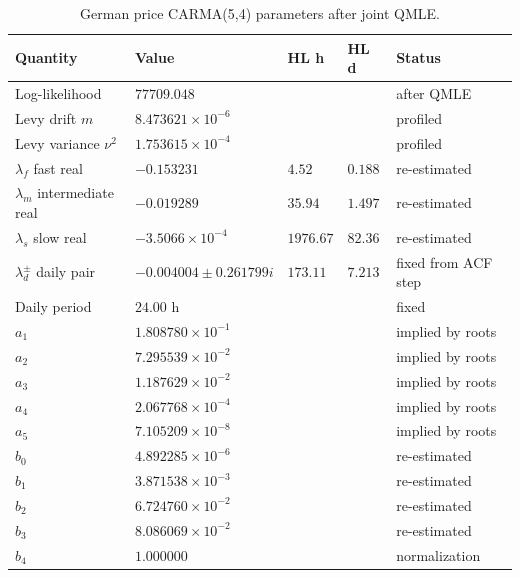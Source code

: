\begin{table}[!htbp]
  \centering
  \caption{German price CARMA(5,4) parameters after joint QMLE.}
  \label{tab:price-carma-after-qmle}
  \begin{tabular}{@{}lllll@{}}
    \toprule
    Quantity & Value & HL h & HL d & Status \\
    \midrule
    Log-likelihood & \(77709.048\) & & & after QMLE \\
    Levy drift \(m\) & \(8.473621{\times}10^{-6}\) & & & profiled \\
    Levy variance \(\nu^2\) & \(1.753615{\times}10^{-4}\) & & & profiled \\
    \midrule
    \(\lambda_f\) fast real & \(-0.153231\) & \(4.52\) & \(0.188\) & re-estimated \\
    \(\lambda_m\) intermediate real & \(-0.019289\) & \(35.94\) & \(1.497\) & re-estimated \\
    \(\lambda_s\) slow real & \(-3.5066{\times}10^{-4}\) & \(1976.67\) & \(82.36\) & re-estimated \\
    \(\lambda_d^\pm\) daily pair & \(-0.004004\pm0.261799i\) & \(173.11\) & \(7.213\) & fixed from ACF step \\
    Daily period & \(24.00\) h & & & fixed \\
    \midrule
    \(a_1\) & \(1.808780{\times}10^{-1}\) & & & implied by roots \\
    \(a_2\) & \(7.295539{\times}10^{-2}\) & & & implied by roots \\
    \(a_3\) & \(1.187629{\times}10^{-2}\) & & & implied by roots \\
    \(a_4\) & \(2.067768{\times}10^{-4}\) & & & implied by roots \\
    \(a_5\) & \(7.105209{\times}10^{-8}\) & & & implied by roots \\
    \midrule
    \(b_0\) & \(4.892285{\times}10^{-6}\) & & & re-estimated \\
    \(b_1\) & \(3.871538{\times}10^{-3}\) & & & re-estimated \\
    \(b_2\) & \(6.724760{\times}10^{-2}\) & & & re-estimated \\
    \(b_3\) & \(8.086069{\times}10^{-2}\) & & & re-estimated \\
    \(b_4\) & \(1.000000\) & & & normalization \\
    \bottomrule
  \end{tabular}
\end{table}

\FloatBarrier

